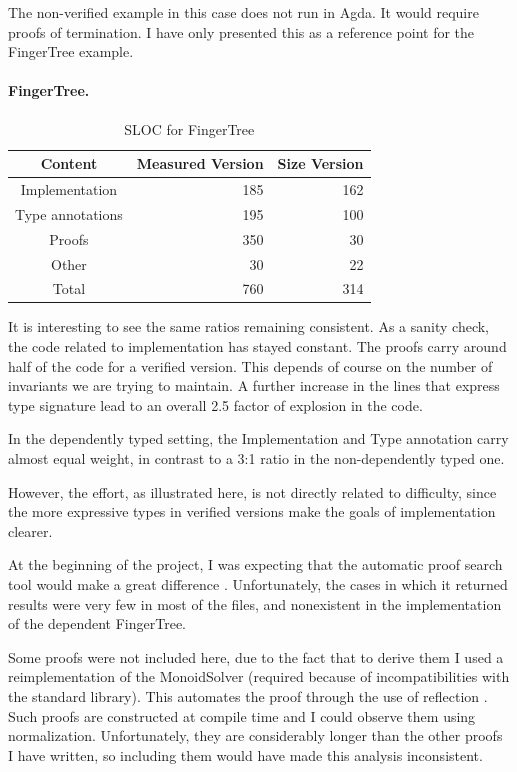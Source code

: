 \documentclass[12pt,twoside,notitlepage]{report}
\begin{document}
The non-verified example in this case does not run in Agda. It would require proofs of termination. I have only presented this as a reference point for the FingerTree example.

\paragraph{FingerTree.}

\begin{table}[H]
\caption{SLOC for FingerTree}
\center
\begin{tabular}{c r r}
\hline 
Content & Measured Version & Size Version \\
\hline
Implementation & 185 & 162 \\ 
Type annotations & 195 & 100 \\
Proofs & 350 & 30 \\
Other & 30 & 22 \\ 
Total & 760 & 314 \\
\hline
\end{tabular}
\end{table} 

It is interesting to see the same ratios remaining consistent. As a sanity check, the code related to implementation has stayed constant. The proofs carry around half of the code for a verified version. This depends of course on the number of invariants we are trying to maintain. A further increase in the lines that express type signature lead to an overall 2.5 factor of explosion in the code. 

In the dependently typed setting, the Implementation and Type annotation carry almost equal weight, in contrast to a 3:1 ratio in the non-dependently typed one.

However, the effort, as illustrated here, is not directly related to difficulty, since the more expressive types in verified versions make the goals of implementation clearer. 

At the beginning of the project, I was expecting that the automatic proof search tool would make a great difference \cite{auto}. Unfortunately, the cases in which it returned results were very few in most of the files, and nonexistent in the implementation of the dependent FingerTree. 

Some proofs were not included here, due to the fact that to derive them I used a reimplementation of the MonoidSolver (required because of incompatibilities with the standard library). This automates the proof through the use of reflection \cite{reflection}. Such proofs are constructed at compile time and I could observe them using normalization. Unfortunately, they are considerably longer than the other proofs I have written, so including them would have made this analysis inconsistent.
\end{document}

